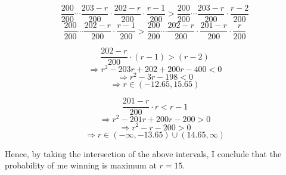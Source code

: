 \documentclass[a4paper,12pt,answers]{exam}
\begin{document}
\begin{questions}
\begin{solution}
\[
\frac{200}{200} \cdots \frac{203-r}{200} \cdot \frac{202-r}{200} \cdot \frac{r - 1}{200} > \frac{200}{200} \cdots \frac{203-r}{200} \cdot \frac{r - 2}{200}
\]
\[
\frac{200}{200} \cdots \frac{202-r}{200} \cdot \frac{r - 1}{200} > \frac{200}{200} \cdots \frac{202-r}{200} \cdot \frac{201-r}{200} \cdot \frac{r}{200}
\]

\vspace{0.5 cm}

\begin{minipage}{0.45\textwidth}
\raggedright
\[
\frac{202-r}{200} \cdot (r-1) > (r-2)
\]
\[
\Rightarrow r^2 - 203r + 202 + 200r - 400 < 0
\]
\[
\Rightarrow r^2 - 3r - 198 < 0
\]
\[
\Rightarrow r \in (-12.65, 15.65)
\]
\end{minipage}
\hfill
\begin{minipage}{0.45\textwidth}
\raggedright
\[
\frac{201-r}{200} \cdot r < r-1
\]
\[
\Rightarrow r^2 - 201r + 200r - 200 > 0
\]
\[
\Rightarrow r^2 - r - 200 > 0
\]
\[
\Rightarrow r \in (-\infty, -13.65) \cup (14.65, \infty)
\]
\end{minipage}

\vspace{0.5 cm}
Hence, by taking the intersection of the above intervals, I conclude that the probability of me winning is maximum at $r=15$.
\end{solution}




\end{questions}
\end{document}
